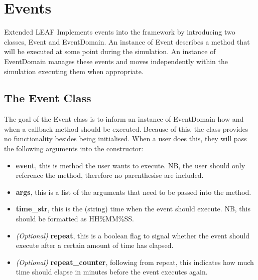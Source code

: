 \documentclass{l4proj}
\begin{document}
\section{Events}\label{imp:sec:envts}
Extended LEAF Implements events into the framework by introducing two classes, Event and EventDomain.
An instance of Event describes a method that will be executed at some point during the simulation.
An instance of EventDomain manages these events and moves independently within the simulation executing them when appropriate.

\subsection{The Event Class}\label{imp:subsec:event-class}
The goal of the Event class is to inform an instance of EventDomain how and when a callback method should be executed.
Because of this, the class provides no functionality besides being initialised.
When a user does this, they will pass the following arguments into the constructor:
\begin{itemize}
    \item \textbf{event}, this is method the user wants to execute. NB, the user should only reference the method, therefore no parenthesise are included.
    \item \textbf{args}, this is a list of the arguments that need to be passed into the method.
    \item \textbf{time\_str}, this is the (string) time when the event should execute. NB, this should be formatted as HH\%MM\%SS.
    \item \textit{(Optional)} \textbf{repeat}, this is a boolean flag to signal whether the event should execute after a certain amount of time has elapsed.
    \item \textit{(Optional)} \textbf{repeat\_counter}, following from repeat, this indicates how much time should elapse in minutes before the event executes again.
\end{itemize}
\end{document}

